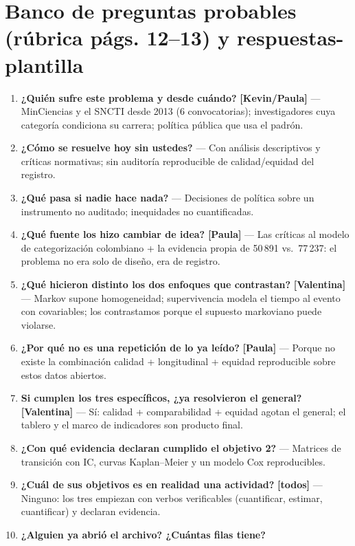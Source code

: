 \documentclass[11pt,a4paper]{article}
\newcommand{\quien}[1]{\textbf{[#1]}}
\begin{document}
\section*{Banco de preguntas probables (rúbrica págs. 12--13) y respuestas-plantilla}
\begin{enumerate}[label=\textbf{P\arabic*.}]
  \item \textbf{¿Quién sufre este problema y desde cuándo?} \quien{Kevin/Paula}
        --- MinCiencias y el SNCTI desde 2013 (6 convocatorias); investigadores
        cuya categoría condiciona su carrera; política pública que usa el padrón.
  \item \textbf{¿Cómo se resuelve hoy sin ustedes?} --- Con análisis
        descriptivos y críticas normativas; sin auditoría reproducible de
        calidad/equidad del registro.
  \item \textbf{¿Qué pasa si nadie hace nada?} --- Decisiones de política sobre
        un instrumento no auditado; inequidades no cuantificadas.
  \item \textbf{¿Qué fuente los hizo cambiar de idea?} \quien{Paula} --- Las
        críticas al modelo de categorización colombiano + la evidencia propia de
        50\,891 vs.\ 77\,237: el problema no era solo de diseño, era de registro.
  \item \textbf{¿Qué hicieron distinto los dos enfoques que contrastan?}
        \quien{Valentina} --- Markov supone homogeneidad; supervivencia modela
        el tiempo al evento con covariables; los contrastamos porque el supuesto
        markoviano puede violarse.
  \item \textbf{¿Por qué no es una repetición de lo ya leído?} \quien{Paula} ---
        Porque no existe la combinación calidad + longitudinal + equidad
        reproducible sobre estos datos abiertos.
  \item \textbf{Si cumplen los tres específicos, ¿ya resolvieron el general?}
        \quien{Valentina} --- Sí: calidad + comparabilidad + equidad agotan el
        general; el tablero y el marco de indicadores son producto final.
  \item \textbf{¿Con qué evidencia declaran cumplido el objetivo 2?} ---
        Matrices de transición con IC, curvas Kaplan--Meier y un modelo Cox
        reproducibles.
  \item \textbf{¿Cuál de sus objetivos es en realidad una actividad?}
        \quien{todos} --- Ninguno: los tres empiezan con verbos verificables
        (cuantificar, estimar, cuantificar) y declaran evidencia.
  \item \textbf{¿Alguien ya abrió el archivo? ¿Cuántas filas tiene?}

\end{enumerate}
\end{document}
